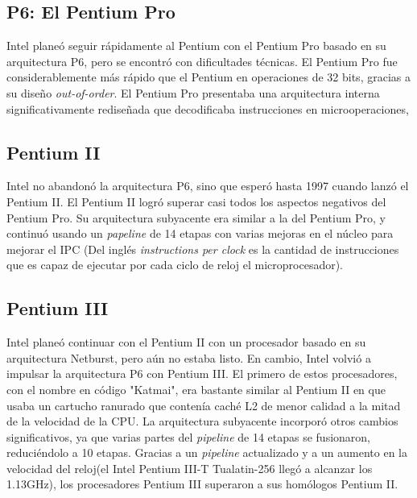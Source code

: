 \subsection{P6: El Pentium Pro}
Intel planeó seguir rápidamente al Pentium con el Pentium Pro basado en su arquitectura P6, pero se encontró con dificultades técnicas. El Pentium Pro fue considerablemente 
más rápido que el Pentium en operaciones de 32 bits, gracias a su diseño \emph{out-of-order}.  El Pentium Pro presentaba una arquitectura interna significativamente rediseñada 
que decodificaba instrucciones en microoperaciones,

\subsection{Pentium II}
Intel no abandonó la arquitectura P6, sino que esperó hasta 1997 cuando lanzó el Pentium II. El Pentium II logró superar casi todos los aspectos negativos del Pentium Pro. 
Su arquitectura subyacente era similar a la del Pentium Pro, y continuó usando un \emph{papeline} de 14 etapas con varias mejoras en el núcleo para mejorar el IPC
(Del inglés \emph{instructions per clock} es la cantidad de instrucciones que es capaz de ejecutar por cada ciclo de reloj el microprocesador).

\subsection{Pentium III}
Intel planeó continuar con el Pentium II con un procesador basado en su arquitectura Netburst, pero aún no estaba listo. En cambio, Intel volvió a impulsar la 
arquitectura P6 con Pentium III. El primero de estos procesadores, con el nombre en código "Katmai", era bastante similar al Pentium II en que usaba un cartucho 
ranurado que contenía caché L2 de menor calidad a la mitad de la velocidad de la CPU. La arquitectura subyacente incorporó otros cambios significativos, ya que varias 
partes del \emph{pipeline} de 14 etapas se fusionaron, reduciéndolo a 10 etapas. Gracias a un \emph{pipeline} actualizado y a un aumento en la velocidad del 
reloj(el Intel Pentium III-T Tualatin-256 llegó a alcanzar los 1.13GHz), los procesadores Pentium III superaron a sus homólogos Pentium II.

